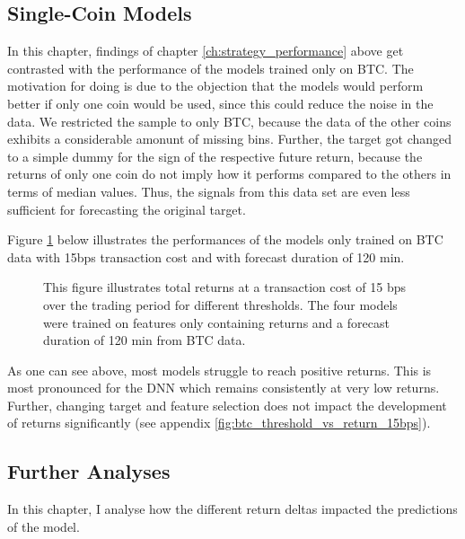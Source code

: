 \subsection{Single-Coin Models} \label{ch:single_coin_models}
In this chapter, findings of chapter \ref{ch:strategy_performance} above get contrasted with the performance of the models trained only on BTC. 
The motivation for doing is due to the objection that the models would perform better if only one coin would be used, 
since this could reduce the noise in the data. We restricted the sample to only BTC, 
because the data of the other coins exhibits a considerable amonunt of missing bins.
Further, the target got changed to a simple dummy for the sign of the respective future return, 
because the returns of only one coin do not imply how it performs compared to the others in terms of median values. 
Thus, the signals from this data set are even less sufficient for forecasting the original target.

Figure \ref{fig:btc_threshold_vs_return_15bps_no_volume_future_return_sign_120min} below illustrates the performances of the models only trained on 
BTC data with 15bps transaction cost and with forecast duration of 120 min.

\begin{figure}[H]
    \captionsetup{format=plain}
    \caption{ 
        This figure illustrates total returns at a transaction cost of 15 bps over the trading period for different thresholds.  
        The four models were trained on features only containing returns and a forecast duration of 120 min from BTC data.
        }
    \label{fig:btc_threshold_vs_return_15bps_no_volume_future_return_sign_120min}
\end{figure}

As one can see above, most models struggle to reach positive returns. This is most pronounced for the DNN which remains consistently at very low returns.
Further, changing target and feature selection does not impact the development of returns significantly (see appendix \ref{fig:btc_threshold_vs_return_15bps}).




\subsection{Further Analyses}
In this chapter, I analyse how the different return deltas impacted the predictions of the model.

